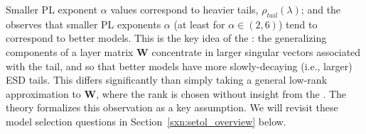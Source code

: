 Smaller PL exponent $\alpha$ values correspond to heavier tails, $\rho_{tail}(\lambda)$; and
the \HTSR \Phenomenology observes that smaller PL exponents $\alpha$ (at least for $\alpha\in(2,6)$) tend to correspond to better models.
This is the key idea of the \HTSR:
the generalizing components of a layer matrix $\mathbf{W}$ concentrate in larger singular vectors associated with the tail, and 
so that better models have more slowly-decaying (i.e., larger) ESD tails.
This differs significantly than simply taking a general low-rank approximation to $\mathbf{W}$, where the rank
is chosen without insight from the \HTSR \Phenomenology. 
The \SETOL theory formalizes this observation as a key assumption. We will revisit these model selection questions in 
Section~\ref{sxn:setol_overview} below.


